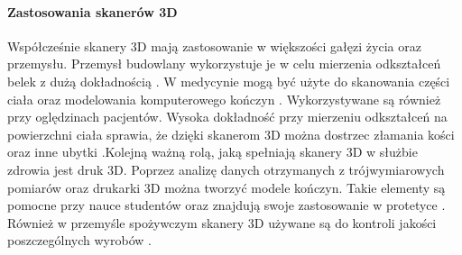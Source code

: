 \documentclass[10pt,twoside]{article}
\begin{document}
\paragraph{Zastosowania skanerów 3D\newline}

Współcześnie skanery 3D mają zastosowanie w większości gałęzi życia oraz przemysłu. Przemysł budowlany wykorzystuje je w celu mierzenia odkształceń belek z dużą dokładnością \cite{goszczynska2014doswiadczalna}. W medycynie mogą być użyte do skanowania części ciała oraz modelowania komputerowego kończyn \cite{tomaka20053d}. Wykorzystywane są również przy oględzinach pacjentów. Wysoka dokładność przy mierzeniu odkształceń na powierzchni ciała sprawia, że dzięki skanerom 3D można dostrzec złamania kości oraz inne ubytki \cite{thali2003optical}.Kolejną ważną rolą, jaką spełniają skanery 3D w służbie zdrowia jest druk 3D. Poprzez analizę danych otrzymanych z trójwymiarowych pomiarów oraz drukarki 3D można tworzyć modele kończyn. Takie elementy są pomocne przy nauce studentów oraz znajdują swoje zastosowanie w protetyce \cite{mcmenamin2014production}. Również w przemyśle spożywczym skanery 3D używane są do kontroli jakości poszczególnych wyrobów \cite{anders2012zastosowanie}.



\end{document}
